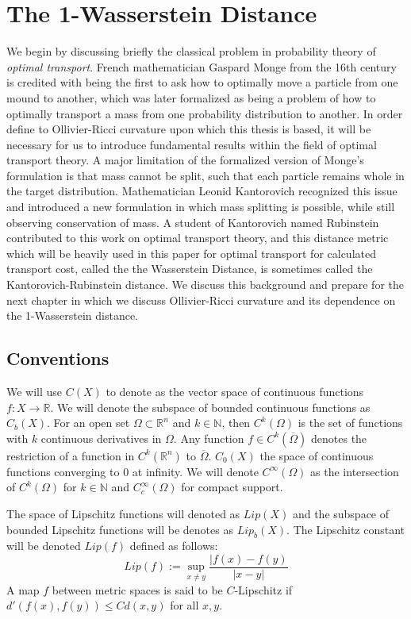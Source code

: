 \documentclass{Dissertate}
\theoremstyle{definition}
\theoremstyle{definition} %
\theoremstyle{definition}
\begin{document}
\chapter{The 1-Wasserstein Distance}

We begin by discussing briefly the classical problem in probability theory of \textit{optimal transport}. French mathematician Gaspard Monge from the 16th century is credited with being the first to ask how to optimally move a particle from one mound to another, which was later formalized as being a problem of how to optimally transport a mass from one probability distribution to another. In order define to Ollivier-Ricci curvature upon which this thesis is based, it will be necessary for us to introduce fundamental results within the field of optimal transport theory. A major limitation of the formalized version of Monge's formulation is that mass cannot be split, such that each particle remains whole in the target distribution. Mathematician Leonid Kantorovich recognized this issue and introduced a new formulation in which mass splitting is possible, while still observing conservation of mass. A student of Kantorovich named Rubinstein contributed to this work on optimal transport theory, and this distance metric which will be heavily used in this paper for optimal transport for calculated transport cost, called the the Wasserstein Distance, is sometimes called the Kantorovich-Rubinstein distance. We discuss this background and prepare for the next chapter in which we discuss Ollivier-Ricci curvature and its dependence on the 1-Wasserstein distance.


\section*{Conventions}

We will use $C(X)$ to denote as the vector space of continuous functions $f: X \rightarrow \mathbb{R}$. We will denote the subspace of bounded continuous functions as $C_b(X)$.  For an open set $\Omega \subset \mathbb{R}^n$ and $k \in \mathbb{N}$, then $C^k(\Omega)$ is the set of functions with $k$ continuous derivatives in $\Omega$. Any function $f \in C^k(\overline{\Omega})$ denotes the restriction of a function in $C^k(\mathbb{R}^n)$ to $\overline{\Omega}$. $C_0(X)$ the space of continuous functions converging to $0$ at infinity. We will denote $C^\infty(\Omega)$ as the intersection of $C^k(\Omega)$ for $k \in \mathbb{N}$ and  $C^\infty_c(\Omega)$ for  compact support.

The space of Lipschitz functions will denoted as $Lip(X)$ and the subspace of bounded Lipschitz functions will be denotes as $Lip_b(X)$. The Lipschitz constant will be denoted $Lip(f)$ defined as follows: 
$$
Lip(f) := \sup_{x \neq y}\frac{|f(x) - f(y)}{|x-y|}
$$
A map $f$ between metric spaces is said to be $C$-Lipschitz if $d'(f(x), f(y)) \leq C d(x,y)$ for all $x, y$.
\end{document}
